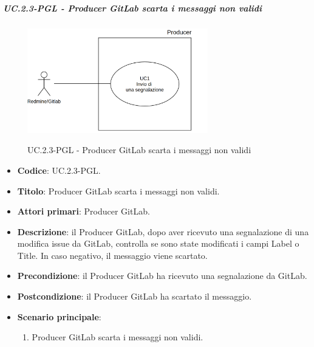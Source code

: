 		\subparagraph{UC\theuccount.2.3-PGL - Producer GitLab scarta i messaggi non validi}
		\begin{figure}[H]
			\centering
			\includegraphics[width=0.7\textwidth]{img/UC1.png}\\
			\caption{UC\theuccount.2.3-PGL - Producer GitLab scarta i messaggi non validi}
		\end{figure}
		\begin{itemize}
			\item \textbf{Codice}: UC\theuccount.2.3-PGL.
			\item \textbf{Titolo}: Producer GitLab scarta i messaggi non validi.
			\item \textbf{Attori primari}: Producer GitLab.
			\item \textbf{Descrizione}: il Producer GitLab, dopo aver ricevuto una segnalazione di una modifica issue da GitLab, controlla
			se sono state modificati i campi Label o Title. In caso negativo, il messaggio viene scartato.
			\item \textbf{Precondizione}: il Producer GitLab ha ricevuto una segnalazione da GitLab.
			\item \textbf{Postcondizione}: il Producer GitLab ha scartato il messaggio.
			\item \textbf{Scenario principale}: 
			\begin{enumerate}
				\item Producer GitLab scarta i messaggi non validi.
			\end{enumerate}
		\end{itemize}